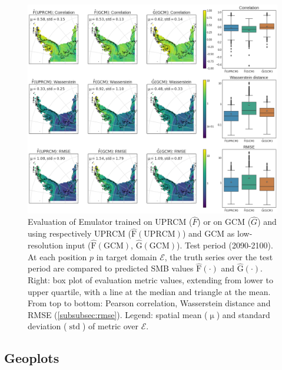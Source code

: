 \documentclass[a4paper,11pt,oneside]{report}
\begin{document}
\begin{figure}[thb]
  \centering
  \includegraphics[width=\columnwidth]{doc/Thesis-latex/images/results/metrics_RCM_GCM.png}
  \caption []{\small Evaluation of Emulator trained on UPRCM ($\hat{F}$) or on GCM ($\hat{G}$) and using respectively UPRCM ($\operatorname{\hat{F}(UPRCM)}$) and GCM as low-resolution input ($\operatorname{\hat{F}(GCM)}$, $\operatorname{\hat{G}(GCM)}$). Test period (2090-2100). At each position $p$ in target domain $\mathcal{E}$, the truth series over the test period are compared to predicted SMB values $\operatorname{\hat{F}(\cdot)}$ and $\operatorname{\hat{G}(\cdot)}$. Right: box plot of evaluation metric values, extending from lower to upper quartile, with a line at the median and triangle at the mean. From top to bottom: Pearson correlation, Wasserstein distance and RMSE (\ref{subsubsec:rmse}). Legend: spatial mean ($\operatorname{\mu}$) and standard deviation ($\operatorname{std}$) of metric over $\mathcal{E}$. }
  \vspace{-3mm}
  \label{fig:evaluation-GCM-RCM}
\end{figure}


\subsection{Geoplots}
\end{document}
